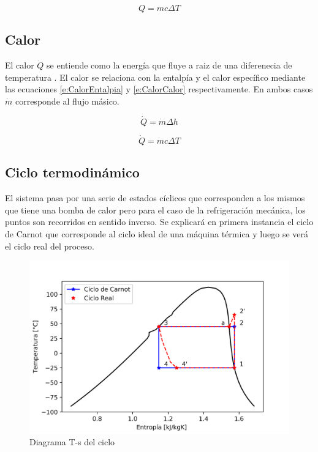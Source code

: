 \documentclass[11pt,letterpaper]{extarticle}        %
\numberwithin{equation}{section}                    %
\begin{document}
\begin{equation}
\label{e:Energia}
Q = m c\Delta T
\end{equation}



\subsection{Calor}
El calor $\dot{Q}$ se entiende como la energía que fluye a raiz de una diferenecia de temperatura \cite[p.5]{b:Produccion}. El calor se relaciona con la entalpía y el calor específico mediante las ecuaciones 
\ref{e:CalorEntalpia} y \ref{e:CalorCalor} respectivamente. En ambos casos $\dot{m}$ corresponde al flujo másico.

\begin{equation}
\label{e:CalorEntalpia}
\dot{Q} = \dot{m} \Delta h
\end{equation}

\begin{equation}
\label{e:CalorCalor}
\dot{Q} = \dot{m} c \Delta T
\end{equation}

\subsection{Ciclo termodinámico}
El sistema pasa por una serie de estados cíclicos que corresponden a los mismos que tiene una bomba de calor pero para el caso de la refrigeración mecánica, los puntos son recorridos en sentido inverso. Se explicará en primera instancia el ciclo de Carnot que corresponde al ciclo ideal de una máquina térmica y luego se verá el ciclo real del proceso.

\begin{figure}
\centering
\includegraphics[width=0.7\linewidth]{Anexo/DiagramaTs}
\caption{Diagrama T-s del ciclo}
\label{f:Ts}
\end{figure}
\end{document}
